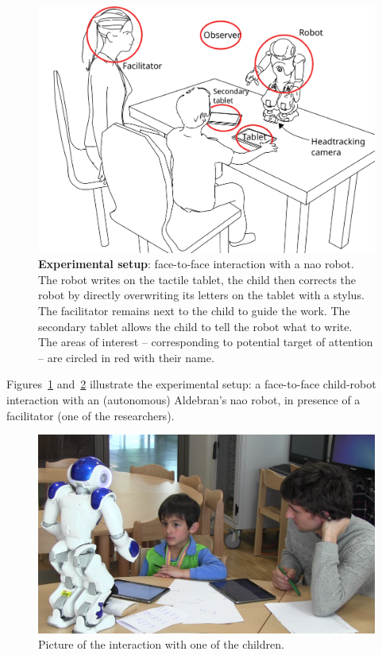 \documentclass{sig-alternate}
\begin{document}
\begin{figure}[h!]
    \centering
    \includegraphics[width=0.8\columnwidth]{experimental_setup}
    \caption{\small \textbf{Experimental setup}: face-to-face interaction with a {\sc
            nao} robot. The robot writes on the tactile tablet, the child then
            corrects the robot by directly overwriting its letters on the tablet
            with a stylus. The facilitator remains next to the child to guide the work. 
            The secondary tablet allows the child to tell the robot what to
            write. The areas of interest -- corresponding to potential target of
            attention -- are circled in red with their name.}
    \label{fig:setup}
\end{figure}


Figures~\ref{fig:setup} and~\ref{fig:realSetup} illustrate the experimental setup: a face-to-face
child-robot interaction with an (autonomous) Aldebran's {\sc nao} robot, in
presence of a facilitator (one of the researchers).

\begin{figure}[h!]
    \centering
    \includegraphics[width=1\columnwidth]{realSetup}
    \caption{\small Picture of the interaction with one of the children.}
    \label{fig:realSetup}
\end{figure}
\end{document}
